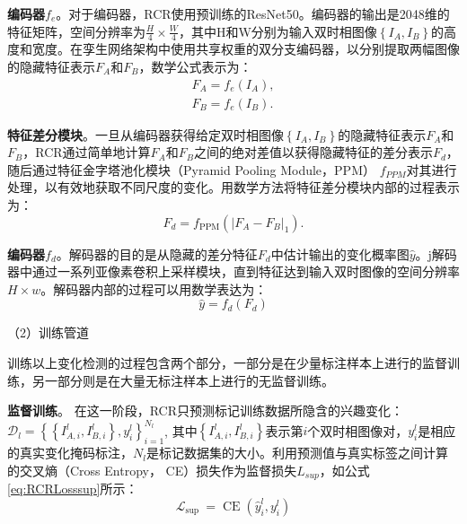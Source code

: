 \documentclass[lang=chs, degree=master, blindreview=false, adobe=false]{yanputhesis}
\begin{document}
\textbf{编码器$f_{e}$}。对于编码器，RCR使用预训练的ResNet50\cite{He2015ResNet}。编码器的输出是2048维的特征矩阵，空间分辨率为$\frac{H}{4} \times \frac{W}{4}$，其中H和W分别为输入双时相图像$\left \{ I_A, I_B \right \} $的高度和宽度。在孪生网络架构中使用共享权重的双分支编码器，以分别提取两幅图像的隐藏特征表示$F_A$和$F_B$，数学公式表示为：
\begin{equation}
  \label{eq:RCRencode}
\begin{array}{l}
  F_{A}=f_{e}\left(I_{A}\right), \\
  F_{B}=f_{e}\left(I_{B}\right) .
  \end{array}
\end{equation}

\textbf{特征差分模块}。一旦从编码器获得给定双时相图像$\left \{ I_A, I_B \right \} $的隐藏特征表示$F_A$和$F_B$，RCR通过简单地计算$F_A$和$F_B$之间的绝对差值以获得隐藏特征的差分表示$F_d$，随后通过特征金字塔池化模块（Pyramid Pooling Module，PPM）\cite{zhao2017PPM} $f_{PPM}$对其进行处理，以有效地获取不同尺度的变化。用数学方法将特征差分模块内部的过程表示为：
\begin{equation}
  \label{eq:RCRppm}
  F_{d}=f_{\mathrm{PPM}}\left(\left|F_{A}-F_{B}\right|_{1}\right) .
\end{equation}

\textbf{编码器$f_{d}$}。解码器的目的是从隐藏的差分特征$F_d$中估计输出的变化概率图$\hat{y} $。j解码器中通过一系列亚像素卷积上采样模块\cite{shi2016upsample}，直到特征达到输入双时图像的空间分辨率$H \times w$。解码器内部的过程可以用数学表达为：
\begin{equation}
  \label{eq:RCRdecode}
  \hat{y}=f_{d}\left(F_{d}\right)
\end{equation}

（2）训练管道

训练以上变化检测的过程包含两个部分，一部分是在少量标注样本上进行的监督训练，另一部分则是在大量无标注样本上进行的无监督训练。

\textbf{监督训练}。
在这一阶段，RCR只预测标记训练数据所隐含的兴趣变化：$\mathcal{D}_{l}=\left\{\left\{I_{A, i}^{l}, I_{B, i}^{l}\right\}, y_{i}^{l}\right\}_{i=1}^{N_{l}}$, 其中$\left\{I_{A, i}^{l}, I_{B, i}^{l}\right\}$表示第$i$个双时相图像对，$y_{i}^{l}$是相应的真实变化掩码标注，${N_{l}}$是标记数据集的大小。利用预测值与真实标签之间计算的交叉熵（Cross Entropy， CE）损失\cite{murphy2012CE}作为监督损失$L_{sup}$，如公式\ref{eq:RCRLosssup}所示：
\begin{equation}
  \label{eq:RCRLosssup}
  \mathcal{L}_{\text {sup }}=\operatorname{CE}\left(\hat{y}_{i}^{l}, y_{i}^{l}\right)
\end{equation}
\end{document}
